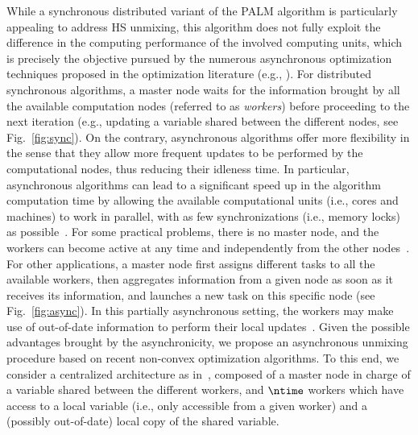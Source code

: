 \documentclass[journal,final,letterpaper,twoside,twocolumn]{IEEEtran}
\begin{document}
While a synchronous distributed variant of the PALM algorithm is particularly appealing to address HS unmixing, this algorithm does not fully exploit the difference in the computing performance of the involved computing units, which is precisely the objective pursued by the numerous asynchronous optimization techniques proposed in the optimization literature (e.g., \cite{Bianchi2013,Liang2014,Chen2015,Lorenzo2015,Facchinei2015,Scutari2017,Yang2016,Pesquet2014,Combettes2016}). For distributed synchronous algorithms, a master node waits for the information brought by all the available computation nodes (referred to as \emph{workers}) before proceeding to the next iteration (e.g., updating a variable shared between the different nodes, see Fig.~\ref{fig:sync}). On the contrary, asynchronous algorithms offer more flexibility in the sense that they allow more frequent updates to be performed by the computational nodes, thus reducing their idleness time. In particular, asynchronous algorithms can lead to a significant speed up in the algorithm computation time by allowing the available computational units (i.e., cores and machines) to work in parallel, with as few synchronizations (i.e., memory locks) as possible~\cite{Peng2016,Davis2016,Cannelli2016}. For some practical problems, there is no master node, and the workers can become active at any time and independently from the other nodes~\cite{Bianchi2016,Davis2016,Cannelli2016}. For other applications, a master node first assigns different tasks to all the available workers, then aggregates information from a given node as soon as it receives its information, and launches a new task on this specific node (see Fig.~\ref{fig:async}). In this partially asynchronous setting, the workers may make use of out-of-date information to perform their local updates~\cite{Combettes2016}. Given the possible advantages brought by the asynchronicity, we propose an asynchronous unmixing procedure based on recent non-convex optimization algorithms. To this end, we consider a centralized architecture as in~\cite{Chang2016}, composed of a master node in charge of a variable shared between the different workers, and $\ntime$ workers which have access to a local variable (i.e., only accessible from a given worker) and a (possibly out-of-date) local copy of the shared variable.
\end{document}
